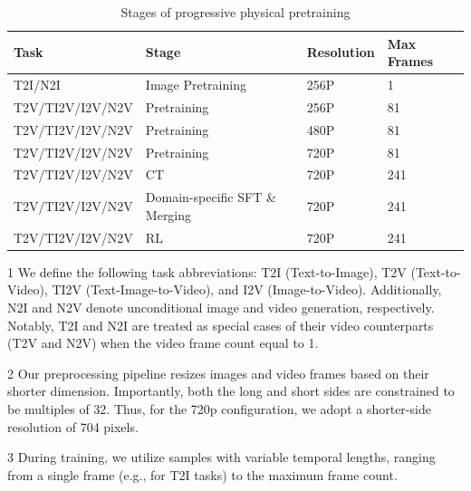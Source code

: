 \begin{table}[t]
\centering
\small
\caption{Stages of progressive physical pretraining}
\label{tab:pretraining_setting}
\begin{threeparttable}
\begin{tabular}{C{4cm} | C{5cm} |C{2cm}| C{2cm}}
\hline 
Task  & Stage & Resolution  & Max Frames  \\ 
\hline
T2I/N2I	& Image Pretraining	& 256P	& 1  \\
\hline
T2V/TI2V/I2V/N2V	&  Pretraining & 256P	& 81  \\
T2V/TI2V/I2V/N2V	&  Pretraining	& 480P	& 81   \\
T2V/TI2V/I2V/N2V	&  Pretraining & 720P	& 81 \\
\hline
T2V/TI2V/I2V/N2V	& CT	& 720P	& 241   \\
\hline
T2V/TI2V/I2V/N2V	& Domain-specific SFT \& Merging	& 720P	& 241  \\
\hline
T2V/TI2V/I2V/N2V	& RL &	720P&	241  \\
\hline
\end{tabular}
\begin{tablenotes}
\footnotesize
\item[1] We define the following task abbreviations: T2I (Text-to-Image), T2V (Text-to-Video), TI2V (Text-Image-to-Video), and I2V (Image-to-Video). Additionally, N2I and N2V denote unconditional image and video generation, respectively. Notably, T2I and N2I are treated as special cases of their video counterparts (T2V and N2V) when the video frame count equal to 1. 
\item[2] Our preprocessing pipeline resizes images and video frames based on their shorter dimension. Importantly, both the long and short sides are constrained to be multiples of 32. Thus, for the 720p configuration, we adopt a shorter-side resolution of 704 pixels.
\item[3] During training, we utilize samples with variable temporal lengths, ranging from a single frame (e.g., for T2I tasks) to the maximum frame count.
\end{tablenotes}
\end{threeparttable}
\end{table}


